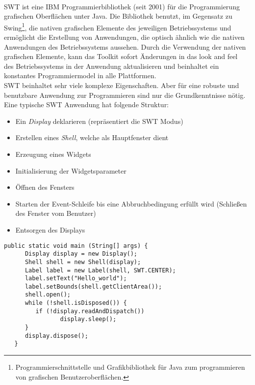\paragraph{}
SWT ist eine IBM Programmierbibliothek (seit 2001) für die Programmierung grafischen Oberflächen unter Java. Die Bibliothek benutzt, im Gegensatz zu Swing\footnote{Programmierschnittstelle und Grafikbibliothek für Java zum programmieren von grafischen Benutzeroberflächen.}, die nativen grafischen Elemente des jeweiligen Betriebssystems und ermöglicht die Erstellung von Anwendungen, die optisch ähnlich wie die nativen Anwendungen des Betriebssystems aussehen. Durch die Verwendung der nativen grafischen Elemente, kann das Toolkit sofort Änderungen in das \glqq look and feel\grqq~ des Betriebssystems in der Anwendung aktualisieren und beinhaltet ein konstantes Programmiermodel in alle Plattformen.
\cite{EclipseSWT}\\

SWT beinhaltet sehr viele komplexe Eigenschaften. Aber für eine robuste und benutzbare Anwendung zur Programmieren sind nur die Grundkenntnisse nötig. Eine typische SWT Anwendung hat folgende Struktur:

\begin{itemize}
\item Ein \textit{Display} deklarieren (repräsentiert die SWT Modus)
\item Erstellen eines \textit{Shell}, welche als Hauptfenster dient
\item Erzeugung eines Widgets
\item Initialisierung der Widgetsparameter
\item Öffnen des Fensters
\item Starten der Event-Schleife bis eine Abbruchbedingung erfüllt wird (Schließen des Fenster vom Benutzer)
\item Entsorgen des Displays
\end{itemize}

\begin{lstlisting}[caption={Beispiel einer SWT Anwendung}, captionpos=b]
   public static void main (String[] args) {
      Display display = new Display();
      Shell shell = new Shell(display);
      Label label = new Label(shell, SWT.CENTER);
      label.setText("Hello_world");
      label.setBounds(shell.getClientArea());
      shell.open();
      while (!shell.isDisposed()) {
         if (!display.readAndDispatch())
         		display.sleep();
      }
      display.dispose();
   }
\end{lstlisting}


